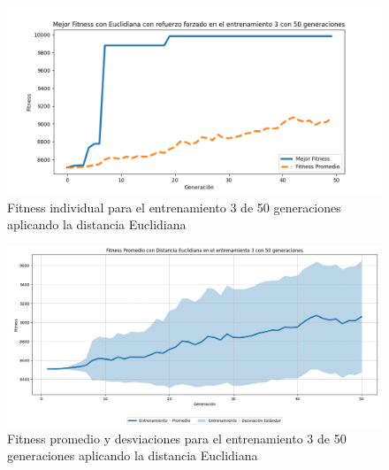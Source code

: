 \documentclass[conference]{IEEEtran}
\begin{document}
\begin{figure}[H]
    \centering
    \includegraphics[width=0.9 \linewidth]{Euclidiana/Fitnes_individual/Fitness_3_Eucli_50Gen.png}
    \caption{Fitness individual para el entrenamiento 3 de 50 generaciones aplicando la distancia Euclidiana}
    \label{fig:eucli_3_50}
\end{figure}
\begin{figure}[H]
    \centering
    \includegraphics[width=0.9 \linewidth]{Euclidiana/Fitnes_individual/Fitness_3_Eucli_50Gen_Sombra.png}
    \caption{Fitness promedio y desviaciones para el entrenamiento 3 de 50 generaciones aplicando la distancia Euclidiana}
    \label{fig:eucli_3_50_sombra}
\end{figure}
\end{document}

